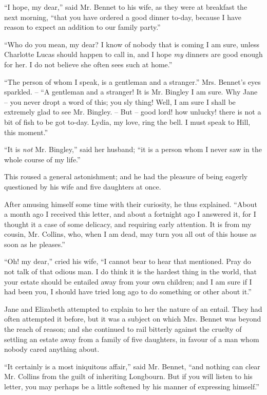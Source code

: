 
“I hope, my dear,” said Mr. Bennet to his wife, as
they were at breakfast the next morning, “that you have
ordered a good dinner to-day, because I have reason to
expect an addition to our family party.”

“Who do you mean, my dear? I know of nobody that
is coming I am sure, unless Charlotte Lucas should happen
to call in, and I hope \textit{my} dinners are good enough for her.
I do not believe she often sees such at home.”

“The person of whom I speak, is a gentleman and a
stranger.” Mrs. Bennet’s eyes sparkled. -- “A gentleman
and a stranger! It is Mr. Bingley I am sure. Why Jane
-- you never dropt a word of this; you sly thing! Well,
I am sure I shall be extremely glad to see Mr. Bingley. --
But -- good lord! how unlucky! there is not a bit of fish
to be got to-day. Lydia, my love, ring the bell. I must
speak to Hill, this moment.”

“It is \textit{not} Mr. Bingley,” said her husband; “it is
a person whom I never saw in the whole course of my
life.”

This roused a general astonishment; and he had the
pleasure of being eagerly questioned by his wife and five
daughters at once.

After amusing himself some time with their curiosity,
he thus explained. “About a month ago I received this
letter, and about a fortnight ago I answered it, for I
thought it a case of some delicacy, and requiring early
attention. It is from my cousin, Mr. Collins, who, when
I am dead, may turn you all out of this house as soon as
he pleases.”

“Oh! my dear,” cried his wife, “I cannot bear to
hear that mentioned. Pray do not talk of that odious
man. I do think it is the hardest thing in the world, that
your estate should be entailed away from your own
children; and I am sure if I had been you, I should have
tried long ago to do something or other about it.”

Jane and Elizabeth attempted to explain to her the
nature of an entail. They had often attempted it before,
but it was a subject on which Mrs. Bennet was beyond
the reach of reason; and she continued to rail bitterly
against the cruelty of settling an estate away from a family
of five daughters, in favour of a man whom nobody cared
anything about.

“It certainly is a most iniquitous affair,” said Mr.
Bennet, “and nothing can clear Mr. Collins from the guilt
of inheriting Longbourn. But if you will listen to his
letter, you may perhaps be a little softened by his manner
of expressing himself.”

